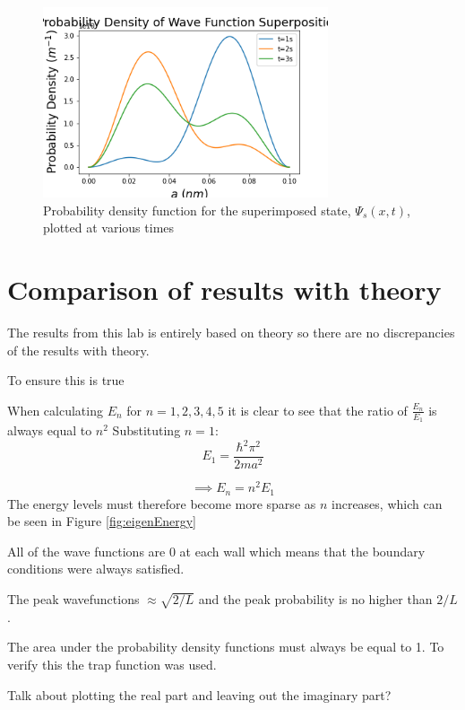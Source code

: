 \begin{figure}[h]
    \centering
    \includegraphics[width=0.75\textwidth]{lab1/images/superpositionPDF.png}
    \caption{Probability density function for the superimposed state, $\Psi_s (x,t)$, plotted at various times}
    \label{fig:superPosPDF}
\end{figure}

\section{Comparison of results with theory}

The results from this lab is entirely based on theory so there are no discrepancies of the results with theory.

To ensure this is true 

When calculating $E_n$ for $n=1,2,3,4,5$ it is clear to see that the ratio of $\frac{E_n}{E_1}$ is always equal to $n^{2}$
Substituting $n=1$:
$$E_1 = \frac{\hbar ^{2}\pi^{2}}{2ma^{2}}$$

\begin{equation}%
\implies E_n =  n^{2}E_1
\end{equation}
The energy levels must therefore become more sparse as $n$ increases, which can be seen in Figure \ref{fig:eigenEnergy}

All of the wave functions are 0 at each wall which means that the boundary conditions were always satisfied.

The peak wavefunctions $\approx \sqrt{2/L}$ and the peak probability is no higher than $2/L$.

The area under the probability density functions must always be equal to 1. To verify this the trap function was used.

Talk about plotting the real part and leaving out the imaginary part?


